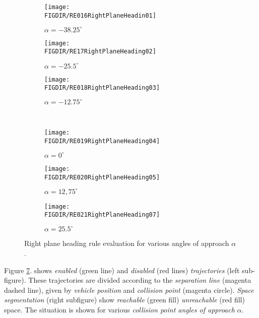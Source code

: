 \begin{figure}[H]
	\centering
    \begin{subfigure}{0.32\textwidth}
    	\centering
        \texttt{[image: \\FIGDIR/RE016RightPlaneHeadin01]} 
        \caption{$\alpha=-38.25^\circ$}
        \label{fig:ruleRightPlaneHeading01}
    \end{subfigure}
    \begin{subfigure}{0.32\textwidth}
    	\centering
        \texttt{[image: \\FIGDIR/RE17RightPlaneHeading02]} 
        \caption{$\alpha=-25.5^\circ$}
        \label{fig:ruleRightPlaneHeading02}
    \end{subfigure}
    \begin{subfigure}{0.32\textwidth}
    	\centering
        \texttt{[image: \\FIGDIR/RE018RightPlaneHeading03]} 
        \caption{$\alpha=-12.75^\circ$}
        \label{fig:ruleRightPlaneHeading03}
    \end{subfigure}
    \\
    \begin{subfigure}{0.32\textwidth}
    	\centering
        \texttt{[image: \\FIGDIR/RE019RightPlaneHeading04]} 
        \caption{$\alpha=0^\circ$}
        \label{fig:ruleRightPlaneHeading04}
    \end{subfigure}
    \begin{subfigure}{0.32\textwidth}
    	\centering
        \texttt{[image: \\FIGDIR/RE020RightPlaneHeading05]} 
        \caption{$\alpha=12,75^\circ$}
        \label{fig:ruleRightPlaneHeading05}
    \end{subfigure}
    \begin{subfigure}{0.32\textwidth}
    	\centering
        \texttt{[image: \\FIGDIR/RE021RightPlaneHeading07]} 
        \caption{$\alpha=25.5^\circ$}
        \label{fig:ruleRightPlaneHeading06}
    \end{subfigure}
    \caption{Right plane heading rule evaluation for various angles of approach $\alpha$.}        
    \label{fig:ruleRightPlaneHeadingGeneral}
\end{figure}

\noindent Figure \ref{fig:ruleRightPlaneHeadingGeneral}. shows \emph{enabled} (green line) and \emph{disabled} (red lines) \emph{trajectories} (left sub-figure). These trajectories are divided according to the \emph{separation line} (magenta dashed line), given by \emph{vehicle position} and \emph{collision point} (magenta circle). \emph{Space segmentation} (right subfigure) show \emph{reachable} (green fill) \emph{unreachable} (red fill) space. The situation is shown for various \emph{collision point angles of approach} $\alpha$.

